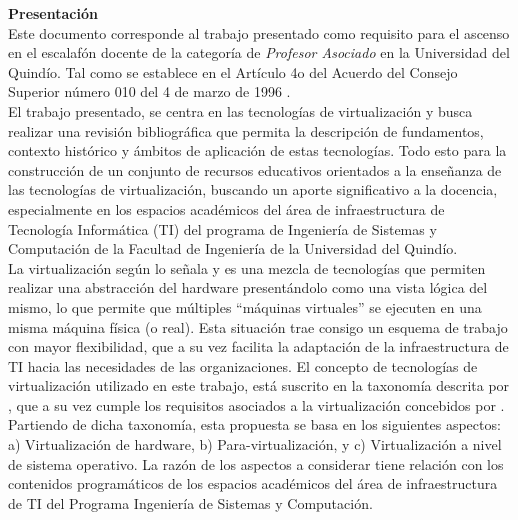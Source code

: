 
{\huge \textbf{Presentación}}\\

Este documento corresponde al trabajo presentado como requisito para el ascenso en el escalafón docente de la categoría de \textit{Profesor Asociado} en la Universidad del Quindío. Tal como se establece en el Artículo 4o del Acuerdo del Consejo Superior número 010 del 4 de marzo de 1996 \parencite{UQ1996}.\\

El trabajo presentado, se centra en las tecnologías de virtualización y busca  realizar una revisión bibliográfica que permita la descripción de fundamentos, contexto histórico y ámbitos de aplicación de estas tecnologías. Todo esto para la construcción de un conjunto de recursos educativos orientados a la enseñanza de las tecnologías de virtualización, buscando un aporte significativo a la docencia, especialmente en los espacios académicos del área de infraestructura de Tecnología Informática (TI) del programa de Ingeniería de Sistemas y Computación de la Facultad de Ingeniería de la Universidad del Quindío.\\

La virtualización según lo señala \textcite{Goldworm2007} y \textcite{Kusnetzky2011} es una mezcla de tecnologías que permiten realizar una abstracción del hardware presentándolo como una vista lógica del mismo, lo que permite que múltiples “máquinas virtuales” se ejecuten en una misma máquina física (o real). Esta situación trae consigo un esquema de trabajo con mayor flexibilidad, que a su vez facilita la adaptación de la infraestructura de TI hacia las necesidades de las organizaciones. El concepto de tecnologías de virtualización utilizado en este trabajo, está suscrito en la taxonomía descrita por \textcite{Pessolani2012}, que a su vez cumple los requisitos asociados a la virtualización concebidos por \textcite{Popek1974}. Partiendo de dicha taxonomía, esta propuesta se basa en los siguientes aspectos: a) Virtualización de hardware, b) Para-virtualización, y c) Virtualización a nivel de sistema operativo. La razón de los aspectos a considerar tiene relación con los contenidos programáticos de los espacios académicos del área de infraestructura de TI del Programa Ingeniería de Sistemas y Computación.\\

